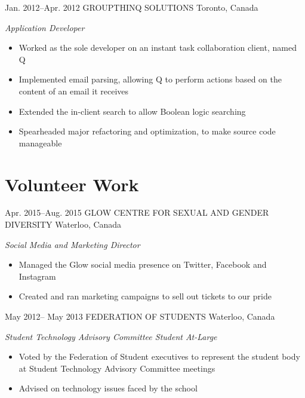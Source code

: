 \documentclass[]{friggeri-cv} %
\begin{document}
\begin{sectionlist}
	\entry
	{Jan. 2012--Apr. 2012}
	{GROUPTHINQ SOLUTIONS}
	{Toronto, Canada}
	{\emph{Application Developer} \\
		\begin{itemize}
			\item Worked as the sole developer on an instant task collaboration client, named Q
			\item Implemented email parsing, allowing Q to perform actions based on the content of an email it receives 	
			\item Extended the in-client search to allow Boolean logic searching
			\item Spearheaded major refactoring and optimization, to make source code manageable 
		\end{itemize}
	}
\end{sectionlist}




\section{Volunteer Work}

\begin{sectionlist}
	
	\entry
	{Apr. 2015--Aug. 2015}
	{GLOW CENTRE FOR SEXUAL AND GENDER DIVERSITY}
	{Waterloo, Canada}
	{\emph{Social Media and Marketing Director} \\
		\begin{itemize}
			\item Managed the Glow social media presence on Twitter, Facebook and Instagram
			\item Created and ran marketing campaigns to sell out tickets to our pride 
		\end{itemize}
	}
	
	
	\entry
	{May 2012-- May 2013}
	{FEDERATION OF STUDENTS}
	{Waterloo, Canada}
	{\emph{Student Technology Advisory Committee Student At-Large} \\
		\begin{itemize}
			\item Voted by the Federation of Student executives to represent the student body at Student Technology Advisory Committee meetings
			\item Advised on technology issues faced by the school
		\end{itemize}
	}	
	
	
\end{sectionlist}
\end{document}
